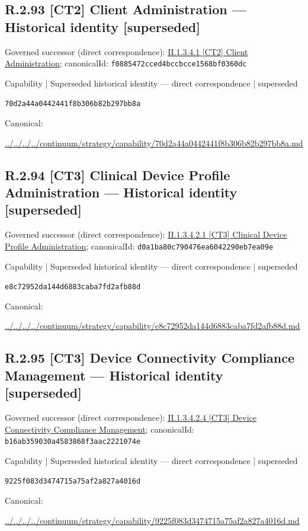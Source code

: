 \documentclass[10pt,a4paper]{article}
\begin{document}
\subsection*{R.2.93 [CT2] Client Administration — Historical identity [superseded]}
Governed successor (direct correspondence): \hyperref[element-f0885472cced4bccbcce1568bf0360dc]{II.1.3.4.1 [CT2] Client Administration}; canonicalId: \texttt{f0885472cced4bccbcce1568bf0360dc}\par
\label{element-70d2a44a0442441f8b306b82b297bb8a}
{\small Capability | Superseded historical identity — direct correspondence | superseded}\par
\texttt{70d2a44a0442441f8b306b82b297bb8a}\par
Canonical: \par
{\footnotesize\url{../../../../continuum/strategy/capability/70d2a44a0442441f8b306b82b297bb8a.md}}\par
\subsection*{R.2.94 [CT3] Clinical Device Profile Administration — Historical identity [superseded]}
Governed successor (direct correspondence): \hyperref[element-d0a1ba80c790476ea6042290eb7ea09e]{II.1.3.4.2.1 [CT3] Clinical Device Profile Administration}; canonicalId: \texttt{d0a1ba80c790476ea6042290eb7ea09e}\par
\label{element-e8c72952da144d6883caba7fd2afb88d}
{\small Capability | Superseded historical identity — direct correspondence | superseded}\par
\texttt{e8c72952da144d6883caba7fd2afb88d}\par
Canonical: \par
{\footnotesize\url{../../../../continuum/strategy/capability/e8c72952da144d6883caba7fd2afb88d.md}}\par
\subsection*{R.2.95 [CT3] Device Connectivity Compliance Management — Historical identity [superseded]}
Governed successor (direct correspondence): \hyperref[element-b16ab359030a4583868f3aac2221074e]{II.1.3.4.2.4 [CT3] Device Connectivity Compliance Management}; canonicalId: \texttt{b16ab359030a4583868f3aac2221074e}\par
\label{element-9225f083d3474715a75af2a827a4016d}
{\small Capability | Superseded historical identity — direct correspondence | superseded}\par
\texttt{9225f083d3474715a75af2a827a4016d}\par
Canonical: \par
{\footnotesize\url{../../../../continuum/strategy/capability/9225f083d3474715a75af2a827a4016d.md}}\par
\end{document}
